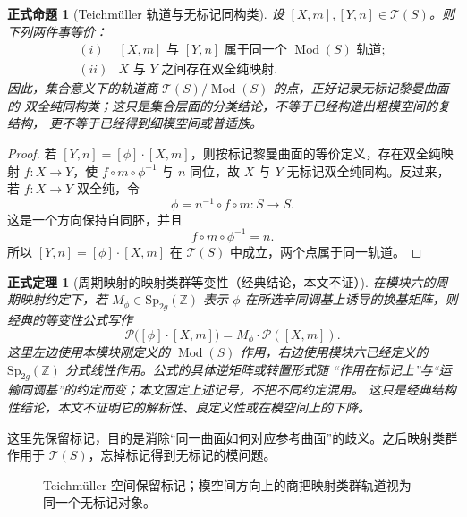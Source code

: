 \documentclass[UTF8,fontset=none,a4paper,11pt]{ctexart}
\theoremstyle{foundation-definition}
\theoremstyle{foundation-theorem}
\newtheorem{theorem}[definition]{正式定理}
\theoremstyle{foundation-proposition}
\newtheorem{proposition}[definition]{正式命题}
\theoremstyle{foundation-example}
\theoremstyle{foundation-remark}
\theoremstyle{foundation-theorem}
\newcommand{\T}{\mathcal T}
\newcommand{\Mod}{\operatorname{Mod}}
\begin{document}
\begin{proposition}[Teichmüller 轨道与无标记同构类]\label{prop:teich-orbits-unmarked}
设 \([X,m],[Y,n]\in\T(S)\)。则下列两件事等价：
\[
\begin{array}{ll}
(i)&[X,m]\text{ 与 }[Y,n]\text{ 属于同一个 }\Mod(S)\text{ 轨道};\\
(ii)&X\text{ 与 }Y\text{ 之间存在双全纯映射}.
\end{array}
\]
因此，集合意义下的轨道商 \(\T(S)/\Mod(S)\) 的点，正好记录无标记黎曼曲面的
双全纯同构类；这只是集合层面的分类结论，不等于已经构造出粗模空间的复结构，
更不等于已经得到细模空间或普适族。
\end{proposition}

\begin{proof}
若 \([Y,n]=[\phi]\cdot[X,m]\)，则按标记黎曼曲面的等价定义，存在双全纯映射
\(f:X\to Y\)，使 \(f\circ m\circ\phi^{-1}\) 与 \(n\) 同位，故 \(X\) 与 \(Y\)
无标记双全纯同构。反过来，若 \(f:X\to Y\) 双全纯，令
\[
\phi=n^{-1}\circ f\circ m:S\to S.
\]
这是一个方向保持自同胚，并且
\[
f\circ m\circ\phi^{-1}=n.
\]
所以 \([Y,n]=[\phi]\cdot[X,m]\) 在 \(\T(S)\) 中成立，两个点属于同一轨道。
\end{proof}

\begin{theorem}[周期映射的映射类群等变性（经典结论，本文不证）]
在模块六的周期映射约定下，若 \(M_\phi\in\mathrm{Sp}_{2g}(\mathbb Z)\)
表示 \(\phi\) 在所选辛同调基上诱导的换基矩阵，则经典的等变性公式写作
\[
\mathcal P\bigl([\phi]\cdot[X,m]\bigr)
=M_\phi\cdot\mathcal P([X,m]).
\]
这里左边使用本模块刚定义的 \(\Mod(S)\) 作用，右边使用模块六已经定义的
\(\mathrm{Sp}_{2g}(\mathbb Z)\) 分式线性作用。公式的具体逆矩阵或转置形式随
“作用在标记上”与“运输同调基”的约定而变；本文固定上述记号，不把不同约定混用。
这只是经典结构性结论，本文不证明它的解析性、良定义性或在模空间上的下降。
\end{theorem}

这里先保留标记，目的是消除“同一曲面如何对应参考曲面”的歧义。之后映射类群作用于 \(\T(S)\)，忘掉标记得到无标记的模问题。

\begin{figure}[htbp]
\centering
{}
\caption{Teichmüller 空间保留标记；模空间方向上的商把映射类群轨道视为同一个无标记对象。}
\label{fig:teich-moduli-quotient}
\end{figure}
\end{document}
